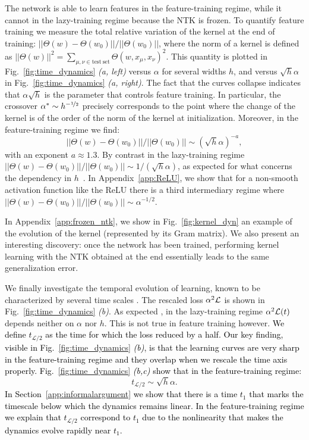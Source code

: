 \documentclass{article}
\newcommand{\be}{\begin{equation}}
\newcommand{\ee}{\end{equation}}
\newcommand{\mm}[1]{\textcolor{black}{#1}}
\renewcommand{\cite}[1]{\citep{#1}}
\newcommand{\mr}{\mathrm}
\newcommand{\abs}[1]{|\!|#1|\!|}
\newcommand{\aref}[1]{Appendix~\ref{#1}}
\newcommand{\sref}[1]{Section~\ref{#1}}
\newcommand{\fref}[1]{Fig.~\ref{#1}}
\begin{document}
The network is able to learn features in the feature-training regime, while it cannot in the lazy-training regime because the NTK is frozen.
To quantify feature training we measure the total relative variation of the kernel at the end of training: $\abs{\Theta(w) - \Theta(w_0)} / \abs{\Theta(w_0)}$, where the norm of a kernel is defined as
$\abs{\Theta(w)}^2 = \sum_{\mu,\nu\in\mr{test\ set}} \Theta(w, x_\mu, x_\nu)^2$.
This quantity is plotted in \fref{fig:time_dynamics} \emph{(a, left)} versus $\alpha$ for several widths $h$, and versus $\sqrt{h}\alpha$ in \fref{fig:time_dynamics} \emph{(a, right)}. The fact that the curves collapse  indicates that $\alpha\sqrt{h}$ is the parameter that controls feature training. In particular, the crossover $\alpha^*\sim h^{-\nicefrac{1}{2}}$ precisely corresponds to the point where the change of the kernel is of the order of the norm of the kernel at initialization.
Moreover, in the feature-training regime we find:
\be
\label{ker}
\abs{\Theta(w) - \Theta(w_0)}/\abs{\Theta(w_0)} \sim (\sqrt{h}\alpha)^{-a},
\ee
with an exponent $a\approx 1.3$. By contrast in the lazy-training regime $\abs{\Theta(w) - \Theta(w_0)}/\abs{\Theta(w_0)} \sim 1/(\sqrt{h}\alpha)$, as expected for what concerns the dependency in $h$~\cite{jacot2019hessian,geiger2019scaling,lee2019wide}. 
In \aref{app:ReLU}, we show that for a non-smooth activation function like the ReLU there is a third intermediary regime where $\abs{\Theta(w) - \Theta(w_0)}/\abs{\Theta(w_0)} \sim \alpha^{-1/2}$.

In \aref{app:frozen_ntk}, we show in \fref{fig:kernel_dyn} an example of the evolution of the kernel (represented by its Gram matrix).
We also present an interesting discovery: once the network has been trained, performing kernel learning with the NTK obtained at the end essentially leads to the same generalization error.

We finally investigate the temporal evolution of learning, known to be characterized by several time scales \cite{Baity18}. The rescaled loss $\alpha^2{\cal L}$ is shown in \fref{fig:time_dynamics} \emph{(b)}. As expected \cite{jacot2018neural,chizat19}, in the lazy-training regime $\alpha^2 {\cal L}(t)$ depends neither on $\alpha$ nor $h$. This is not true in feature training however. \mm{We define $t_{\mathcal{L}/2}$ as the time for which the loss reduced by a half. Our key finding, visible in \fref{fig:time_dynamics} \emph{(b)}, is that the learning curves are very sharp in the feature-training regime and they overlap when we rescale the time axis properly. \fref{fig:time_dynamics} \emph{(b,c)} show that in the feature-training regime:}
\be
\label{time}
t_{\mathcal{L}/2}\sim \sqrt{h}\alpha.
\ee
\mm{In \sref{app:informalargument} we show that there is a time $t_1$ that marks the timescale below which the dynamics remains linear. In the feature-training regime we explain that $t_{\mathcal{L}/2}$ correspond to $t_1$ due to the nonlinearity that makes the dynamics evolve rapidly near $t_1$.}
\end{document}
